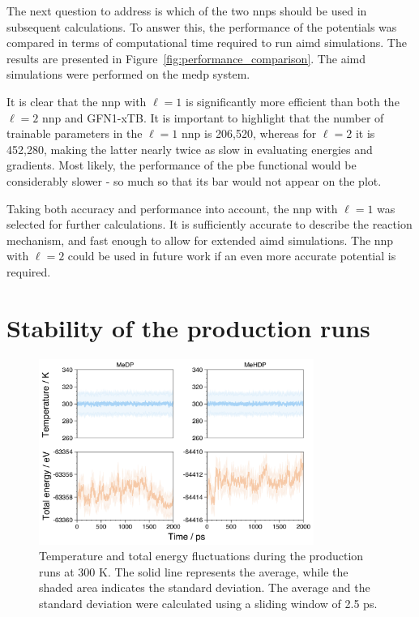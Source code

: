 The next question to address is which of the two \acp{nnp} should be used in subsequent calculations. To answer this, the performance of the potentials was compared in terms of computational time required to run \ac{aimd} simulations. The results are presented in Figure~\ref{fig:performance_comparison}. The \ac{aimd} simulations were performed on the \ac{medp} system.

It is clear that the \ac{nnp} with $\ell=1$ is significantly more efficient than both the $\ell=2$ \ac{nnp} and GFN1-xTB. It is important to highlight that the number of trainable parameters in the $\ell=1$ \ac{nnp} is 206,520, whereas for $\ell=2$ it is 452,280, making the latter nearly twice as slow in evaluating energies and gradients. Most likely, the performance of the \ac{pbe} functional would be considerably slower - so much so that its bar would not appear on the plot.

Taking both accuracy and performance into account, the \ac{nnp} with $\ell=1$ was selected for further calculations. It is sufficiently accurate to describe the reaction mechanism, and fast enough to allow for extended \ac{aimd} simulations. The \ac{nnp} with $\ell=2$ could be used in future work if an even more accurate potential is required.



\section{Stability of the production runs}

\begin{figure}[ht]
    \centering
    \includegraphics[width=0.8\textwidth]{Figures/4_Results/results_aimd_stability.png}
    \caption{Temperature and total energy fluctuations during the production runs at 300 K. The solid line represents the average, while the shaded area indicates the standard deviation. The average and the standard deviation were calculated using a sliding window of 2.5 ps.}
    \label{fig:temp_energy_fluctuations}
\end{figure}



